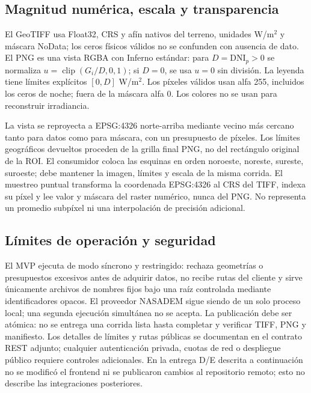 \documentclass[11pt,a4paper]{article}
\begin{document}
\subsection{Magnitud numérica, escala y transparencia}
El GeoTIFF usa Float32, CRS y afín nativos del terreno, unidades W/m$^2$ y máscara NoData; los ceros físicos válidos no se confunden con ausencia de dato. El PNG es una vista RGBA con Inferno estándar: para $D=\mathrm{DNI}_{p}>0$ se normaliza $u=\operatorname{clip}(G_i/D,0,1)$; si $D=0$, se usa $u=0$ sin división. La leyenda tiene límites explícitos $[0,D]$ W/m$^2$. Los píxeles válidos usan alfa 255, incluidos los ceros de noche; fuera de la máscara alfa 0. Los colores no se usan para reconstruir irradiancia.

La vista se reproyecta a EPSG:4326 norte-arriba mediante vecino más cercano tanto para datos como para máscara, con un presupuesto de píxeles. Los límites geográficos devueltos proceden de la grilla final PNG, no del rectángulo original de la ROI. El consumidor coloca las esquinas en orden noroeste, noreste, sureste, suroeste; debe mantener la imagen, límites y escala de la misma corrida. El muestreo puntual transforma la coordenada EPSG:4326 al CRS del TIFF, indexa su píxel y lee valor y máscara del raster numérico, nunca del PNG. No representa un promedio subpíxel ni una interpolación de precisión adicional.

\subsection{Límites de operación y seguridad}
El MVP ejecuta de modo síncrono y restringido: rechaza geometrías o presupuestos excesivos antes de adquirir datos, no recibe rutas del cliente y sirve únicamente archivos de nombres fijos bajo una raíz controlada mediante identificadores opacos. El proveedor NASADEM sigue siendo de un solo proceso local; una segunda ejecución simultánea no se acepta. La publicación debe ser atómica: no se entrega una corrida lista hasta completar y verificar TIFF, PNG y manifiesto. Los detalles de límites y rutas públicas se documentan en el contrato REST adjunto; cualquier autenticación privada, cuotas de red o despliegue público requiere controles adicionales. En la entrega D/E descrita a continuación no se modificó el frontend ni se publicaron cambios al repositorio remoto; esto no describe las integraciones posteriores.
\end{document}

